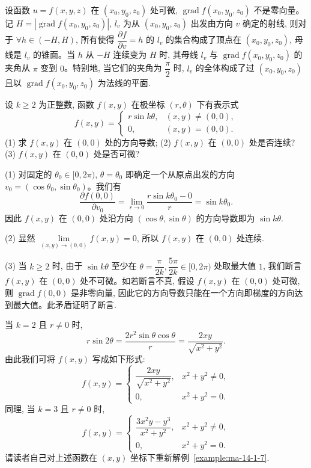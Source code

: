 设函数 $u=f(x,y,z)$ 在 $(x_0,y_0,z_0)$ 处可微, $\operatorname{grad}f(x_0,y_0,z_0)$ 不是零向量。记 $H=|\operatorname{grad}f(x_0,y_0,z_0)|$, $l_v$ 为从 $(x_0,y_0,z_0)$ 出发由方向 $v$ 确定的射线, 则对于 $\forall h\in(-H,H)$, 所有使得 $\dfrac{\partial f}{\partial v}=h$ 的 $l_v$ 的集合构成了顶点在 $(x_0,y_0,z_0)$, 母线是 $l_v$ 的锥面。当 $h$ 从 $-H$ 连续变为 $H$ 时, 其母线 $l_v$ 与 $\operatorname{grad}f(x_0,y_0,z_0)$ 的夹角从 $\pi$ 变到 $0$。特别地, 当它们的夹角为 $\dfrac\pi2$ 时, $l_v$ 的全体构成了过 $(x_0,y_0,z_0)$ 且以 $\operatorname{grad}f(x_0,y_0,z_0)$ 为法线的平面.

\begin{example}\label{example:ma-14-1-7}
设 $k\geqslant2$ 为正整数, 函数 $f(x,y)$ 在极坐标 $(r,\theta)$ 下有表示式
\[
  f(x,y)=
  \begin{cases}
    r\sin k\theta, &(x,y)\ne(0,0),\\
    0, &(x,y)=(0,0).
  \end{cases}
\]
(1) 求 $f(x,y)$ 在 $(0,0)$ 处的方向导数; (2) $f(x,y)$ 在 $(0,0)$ 处是否连续? (3) $f(x,y)$ 在 $(0,0)$ 处是否可微?
\end{example}


\begin{solve}
(1) 对固定的 $\theta_0\in[0,2\pi)$, $\theta=\theta_0$ 即确定一个从原点出发的方向 $v_0=(\cos\theta_0,\sin\theta_0)$。我们有
\[
  \frac{\partial f(0,0)}{\partial v_0}
  =\lim_{r\to0}\frac{r\sin k\theta_0-0}{r}
  =\sin k\theta_0.
\]
因此 $f(x,y)$ 在 $(0,0)$ 处沿方向 $(\cos\theta,\sin\theta)$ 的方向导数即为 $\sin k\theta$.

(2) 显然 $\lim\limits_{(x,y)\to(0,0)}f(x,y)=0$, 所以 $f(x,y)$ 在 $(0,0)$ 处连续.

(3) 当 $k\geqslant2$ 时, 由于 $\sin k\theta$ 至少在 $\theta=\dfrac{\pi}{2k}, \dfrac{5\pi}{2k}\in[0,2\pi)$ 处取最大值 $1$, 我们断言 $f(x,y)$ 在 $(0,0)$ 处不可微。如若断言不真, 假设 $f(x,y)$ 在 $(0,0)$ 处可微, 则 $\operatorname{grad}f(0,0)$ 是非零向量, 因此它的方向导数只能在一个方向即梯度的方向达到最大值。此矛盾证明了断言.
\end{solve}


\begin{remark}\label{remark:ma-14-source-26}
当 $k=2$ 且 $r\ne0$ 时,
\[
  r\sin2\theta=\frac{2r^2\sin\theta\cos\theta}{r}
  =\frac{2xy}{\sqrt{x^2+y^2}}.
\]
由此我们可将 $f(x,y)$ 写成如下形式:
\[
  f(x,y)=
  \begin{cases}
    \dfrac{2xy}{\sqrt{x^2+y^2}}, &x^2+y^2\ne0,\\
    0, &x^2+y^2=0.
  \end{cases}
\]
同理, 当 $k=3$ 且 $r\ne0$ 时,
\[
  f(x,y)=
  \begin{cases}
    \dfrac{3x^2y-y^3}{x^2+y^2}, &x^2+y^2\ne0,\\
    0, &x^2+y^2=0.
  \end{cases}
\]
请读者自己对上述函数在 $(x,y)$ 坐标下重新解例~\ref{example:ma-14-1-7}.
\end{remark}



